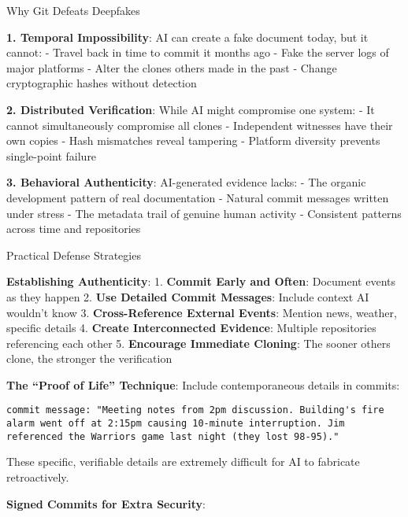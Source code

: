 Why Git Defeats Deepfakes

\textbf{1. Temporal Impossibility}: AI can create a fake document today,
but it cannot: - Travel back in time to commit it months ago - Fake the
server logs of major platforms - Alter the clones others made in the
past - Change cryptographic hashes without detection

\textbf{2. Distributed Verification}: While AI might compromise one
system: - It cannot simultaneously compromise all clones - Independent
witnesses have their own copies - Hash mismatches reveal tampering -
Platform diversity prevents single-point failure

\textbf{3. Behavioral Authenticity}: AI-generated evidence lacks: - The
organic development pattern of real documentation - Natural commit
messages written under stress - The metadata trail of genuine human
activity - Consistent patterns across time and repositories

Practical Defense Strategies

\textbf{Establishing Authenticity}: 1. \textbf{Commit Early and Often}:
Document events as they happen 2. \textbf{Use Detailed Commit Messages}:
Include context AI wouldn't know 3. \textbf{Cross-Reference External
Events}: Mention news, weather, specific details 4. \textbf{Create
Interconnected Evidence}: Multiple repositories referencing each other
5. \textbf{Encourage Immediate Cloning}: The sooner others clone, the
stronger the verification

\textbf{The ``Proof of Life'' Technique}: Include contemporaneous
details in commits:

\begin{verbatim}
commit message: "Meeting notes from 2pm discussion. Building's fire alarm went off at 2:15pm causing 10-minute interruption. Jim referenced the Warriors game last night (they lost 98-95)."
\end{verbatim}

These specific, verifiable details are extremely difficult for AI to
fabricate retroactively.

\textbf{Signed Commits for Extra Security}:

\begin{Shaded}
\begin{Highlighting}[]
  
\end{Highlighting}
\end{Shaded}

